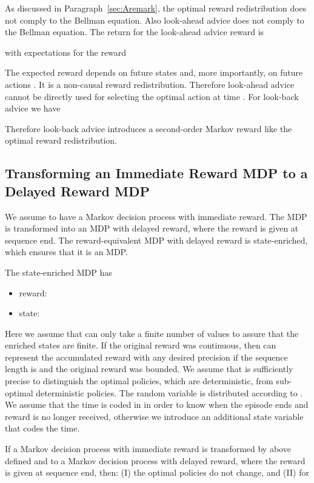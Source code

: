 \documentclass{article}
\begin{document}
\begin{appendices}
As discussed in Paragraph~\ref{sec:Aremark},
the optimal reward redistribution does not 
comply to the Bellman equation.
Also look-ahead advice does not comply to the 
Bellman equation.
The return for the look-ahead advice reward  is

with expectations for the reward 

The expected reward  depends on 
future states  and, more importantly, on future actions .
It is a non-causal reward redistribution.
Therefore look-ahead advice cannot be directly used for selecting the 
optimal action at time .
For look-back advice we have

Therefore look-back advice introduces a 
second-order Markov reward like the optimal reward redistribution.


\subsection{Transforming an Immediate Reward MDP to a Delayed Reward MDP}
\label{sec:Aequiv}

We assume to have a Markov decision process  with immediate reward. 
The MDP  is transformed into an MDP  with delayed
reward, where the reward is given at sequence end.
The reward-equivalent MDP  with delayed reward 
is state-enriched,
which ensures that it is an MDP. 

The state-enriched MDP  has
\begin{itemize}
\item reward:

 \item state:
 
\end{itemize}
Here we assume that  can only take a finite number of values to assure
that the enriched states  are finite. 
If the original reward was continuous, then  can represent the accumulated reward 
with any desired precision if the sequence length is  and the original reward was
bounded. We assume that  is sufficiently precise to distinguish the 
optimal policies, which are deterministic, from sub-optimal deterministic policies. 
The random variable  is distributed according to
.
We assume that the time  is coded in  in order to know when the
episode ends and reward is no longer received, otherwise we introduce
an additional state variable  that codes the time.


\begin{propositionA}
\label{th:AreturnEqu}
If a Markov decision process  with immediate reward is
transformed by above defined  and  
to a Markov decision process  with delayed
reward, where the reward is given at sequence end, then:
(I) the optimal policies do not change, and (II)
for 


\end{propositionA}
\end{appendices}
\end{document}

